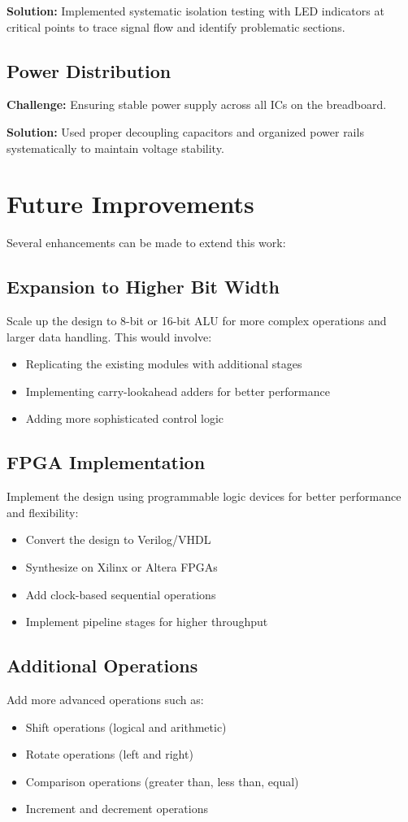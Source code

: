 \textbf{Solution:} Implemented systematic isolation testing with LED indicators at critical points to trace signal flow and identify problematic sections.

\subsection{Power Distribution}
\textbf{Challenge:} Ensuring stable power supply across all ICs on the breadboard.

\textbf{Solution:} Used proper decoupling capacitors and organized power rails systematically to maintain voltage stability.

\section{Future Improvements}

Several enhancements can be made to extend this work:

\subsection{Expansion to Higher Bit Width}
Scale up the design to 8-bit or 16-bit ALU for more complex operations and larger data handling. This would involve:
\begin{itemize}
    \item Replicating the existing modules with additional stages
    \item Implementing carry-lookahead adders for better performance
    \item Adding more sophisticated control logic
\end{itemize}

\subsection{FPGA Implementation}
Implement the design using programmable logic devices for better performance and flexibility:
\begin{itemize}
    \item Convert the design to Verilog/VHDL
    \item Synthesize on Xilinx or Altera FPGAs
    \item Add clock-based sequential operations
    \item Implement pipeline stages for higher throughput
\end{itemize}

\subsection{Additional Operations}
Add more advanced operations such as:
\begin{itemize}
    \item Shift operations (logical and arithmetic)
    \item Rotate operations (left and right)
    \item Comparison operations (greater than, less than, equal)
    \item Increment and decrement operations
\end{itemize}

